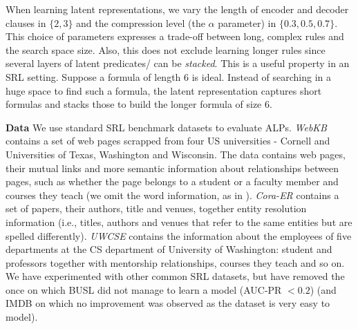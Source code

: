 
When learning latent representations, we vary the length of encoder and decoder clauses in $\{2,3\}$ and the compression level (the $\alpha$ parameter) in $\{0.3, 0.5, 0.7\}$.
This choice of parameters expresses a trade-off between long, complex rules and the search space size. 
Also, this does not exclude learning longer rules since several layers of latent predicates/ can be \textit{stacked}. 
This is a useful property in an SRL setting. 
Suppose a formula of length 6 is ideal. 
Instead of searching in a huge space to find such a formula, the latent representation captures short formulas and stacks those to build the longer formula of size 6.




\textbf{Data}
We use standard SRL benchmark datasets to evaluate ALPs.
\textit{WebKB} contains a set of web pages scrapped from four US universities - Cornell and Universities of Texas, Washington and Wisconsin.
The data contains web pages, their mutual links and more semantic information about relationships between pages, such as whether the page belongs to a student or a faculty member and courses they teach (we omit the word information, as in \cite{mihalkova:icml07}).
\textit{Cora-ER} contains a set of papers, their authors, title and venues, together entity resolution information (i.e., titles, authors and venues that refer to the same entities but are spelled differently).
\textit{UWCSE} contains the information about the employees of five departments at the CS department of University of Washington: student and professors together with mentorship relationships, courses they teach and so on.
We have experimented with other common SRL datasets, but have removed the once on which BUSL did not manage to learn a model (AUC-PR $< 0.2$) (and IMDB on which no improvement was observed as the dataset is very easy to model).








